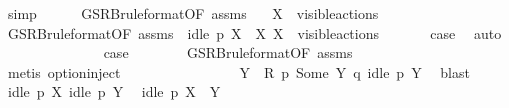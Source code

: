\begin{isabellebody}
\ simp\isanewline
\ \ \ \ \isamarkupfalse%
\ GSRB{\isacharunderscore}{\kern0pt}ruleformat{\isacharparenleft}{\kern0pt}{}{\isacharparenright}{\kern0pt}{\isacharbrackleft}{\kern0pt}OF\ assms\ {}{\isacharparenleft}{\kern0pt}{}{\isacharparenright}{\kern0pt}{\isacharbrackright}{\kern0pt}\ \isamarkupfalse%
\ {\isacartoucheopen}X\ {\isasymsubseteq}\ visible{\isacharunderscore}{\kern0pt}actions{\isacartoucheclose}\ \isacommand{{\isachardot}{\kern0pt}}\isamarkupfalse%
\isanewline
\ \ \ \ \isamarkupfalse%
\ GSRB{\isacharunderscore}{\kern0pt}ruleformat{\isacharparenleft}{\kern0pt}{}{\isacharparenright}{\kern0pt}{\isacharbrackleft}{\kern0pt}OF\ assms\ {}{\isacharparenleft}{\kern0pt}{}{\isacharparenright}{\kern0pt}\ {\isacartoucheopen}idle\ p\ {\isacharparenleft}{\kern0pt}X\ {\isasymunion}\ X{\isacharparenright}{\kern0pt}{\isacartoucheclose}\ {\isacartoucheopen}X\ {\isasymsubseteq}\ visible{\isacharunderscore}{\kern0pt}actions{\isacartoucheclose}\ {}{\isacharparenleft}{\kern0pt}{}{\isacharparenright}{\kern0pt}{\isacharbrackright}{\kern0pt}\isanewline
\ \ \ \ \isamarkupfalse%
\ {\isacharquery}{\kern0pt}case\ \isamarkupfalse%
\ auto\isanewline
\ \ \isamarkupfalse%
\isanewline
\ \ \ \ \isamarkupfalse%
\ {}\isanewline
\ \ \ \ \isamarkupfalse%
\ {\isacharquery}{\kern0pt}case\isanewline
\ \ \ \ \ \ \isamarkupfalse%
\ GSRB{\isacharunderscore}{\kern0pt}ruleformat{\isacharparenleft}{\kern0pt}{}{\isacharparenright}{\kern0pt}{\isacharbrackleft}{\kern0pt}OF\ assms{\isacharbrackright}{\kern0pt}\isanewline
\ \ \ \ \ \ \isamarkupfalse%
\ {\isacharparenleft}{\kern0pt}metis\ option{\isachardot}{\kern0pt}inject{\isacharparenright}{\kern0pt}\isanewline
\ \ \isamarkupfalse%
\isanewline
\ \ \ \ \isamarkupfalse%
\ {}\isanewline
\ \ \ \ \isamarkupfalse%
\ \isamarkupfalse%
\ Y\ \ {\isacartoucheopen}R\ p\ {\isacharparenleft}{\kern0pt}Some\ Y{\isacharparenright}{\kern0pt}\ q{\isacartoucheclose}\ {\isacartoucheopen}idle\ p\ Y{\isacartoucheclose}\ \isamarkupfalse%
\ blast\isanewline
\ \ \ \ \isamarkupfalse%
\ {\isacartoucheopen}idle\ p\ X{\isacartoucheclose}\ {\isacartoucheopen}idle\ p\ Y{\isacartoucheclose}\ \isamarkupfalse%
\ {\isacartoucheopen}idle\ p\ {\isacharparenleft}{\kern0pt}X\ {\isasymunion}\ Y{\isacharparenright}{\kern0pt}{\isacartoucheclose}\isanewline

\end{isabellebody}
